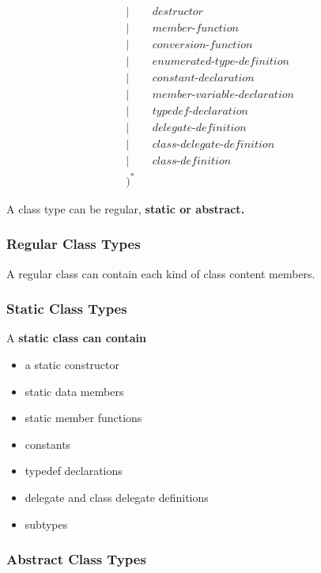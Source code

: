 \documentclass[a4paper,oneside,11pt]{article}
\begin{document}
\begin{align*}
&| & &\hyperref[destructor]{destructor}\\
&| & &\hyperref[memberfunction]{member\textrm{-}function}\\
&| & &\hyperref[conversionfunction]{conversion\textrm{-}function}\\
&| & &\hyperref[sec:enumerations]{enumerated\textrm{-}type\textrm{-}definition}\\
&| & &\hyperref[constantdeclaration]{constant\textrm{-}declaration}\\
&| & &\hyperref[membervariabledeclaration]{member\textrm{-}variable\textrm{-}declaration}\\
&| & &\hyperref[typedefdeclaration]{typedef\textrm{-}declaration}\\
&| & &\hyperref[delegatedefinition]{delegate\textrm{-}definition}\\
&| & &\hyperref[classdelegatedefinition]{class\textrm{-}delegate\textrm{-}definition}\\
&| & &\hyperref[classdefinition]{class\textrm{-}definition}\\
&)^*
\end{align*}

A class type can be regular, \bf{static} or \bf{abstract}.

\subsubsection{Regular Class Types}

A regular class can contain each kind of class content members.

\subsubsection{Static Class Types}

A \bf{static} class can contain
\begin{itemize}
\item a static constructor
\item static data members
\item static member functions
\item constants
\item typedef declarations
\item delegate and class delegate definitions
\item subtypes
\end{itemize}

\subsubsection{Abstract Class Types}
\end{document}
